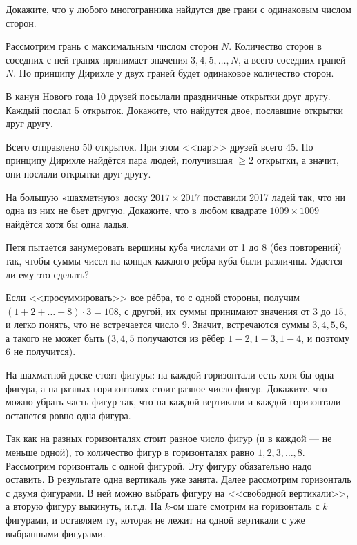 \documentclass[12pt,a4paper]{article}
\begin{document}


 Докажите, что у любого многогранника найдутся две грани с одинаковым числом сторон.

  Рассмотрим грань с максимальным числом сторон $N$. Количество сторон в соседних с ней гранях принимает значения $3,4,5,\ldots,N$, а всего соседних граней $N$. По принципу Дирихле у двух граней будет одинаковое количество сторон. 

 В канун Нового года 10 друзей посылали праздничные открытки друг другу. Каждый послал 5 открыток. Докажите, что найдутся двое, пославшие открытки друг другу.

 Всего отправлено 50 открыток. При этом <<пар>> друзей всего 45. По принципу Дирихле найдётся пара людей, получившая $\geq 2$ открытки, а значит, они послали открытки друг другу.

  На большую «шахматную» доску $2017\times 2017$ поставили 2017 ладей так, что ни одна из них не бьет другую. Докажите, что в любом квадрате
$1009 \times 1009$ найдётся хотя бы одна ладья.

  Петя пытается занумеровать вершины куба числами от 1 до 8 (без повторений) так, чтобы суммы чисел на концах каждого ребра куба были различны. Удастся ли ему это сделать?

 Если <<просуммировать>> все рёбра, то с одной стороны, получим $(1+2+\ldots+8)\cdot 3 =108$, с другой, их суммы принимают значения от $3$ до $15$, и легко понять, что не встречается число $9$. Значит, встречаются суммы $3,4,5,6$, а такого не может быть ($3,4,5$ получаются из рёбер $1-2, 1-3,1-4$, и поэтому $6$ не получится).

  На шахматной доске стоят фигуры: на каждой горизонтали есть хотя бы одна фигура, а на разных горизонталях стоит разное число фигур. Докажите, что можно убрать часть фигур так, что на каждой вертикали и каждой горизонтали останется ровно одна фигура.

 Так как на разных горизонталях стоит разное число фигур (и в каждой --- не меньше одной), то количество фигур в горизонталях равно $1,2,3,\ldots,8$. Рассмотрим горизонталь с одной фигурой. Эту фигуру обязательно надо оставить. В результате одна вертикаль уже занята. Далее рассмотрим горизонталь с двумя фигурами. В ней можно выбрать фигуру на <<свободной вертикали>>, а вторую фигуру выкинуть, и.т.д. На $k$-ом шаге смотрим на горизонталь с $k$ фигурами, и оставляем ту, которая не лежит на одной вертикали с уже выбранными фигурами.
\end{document}
